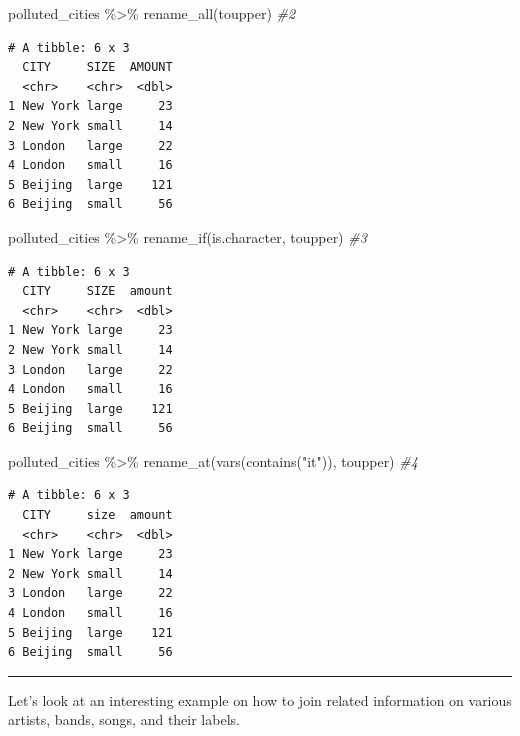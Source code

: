 \documentclass[
]{book}
\newenvironment{Shaded}{\begin{snugshade}}{\end{snugshade}}
\newcommand{\CommentTok}[1]{\textcolor[rgb]{0.56,0.35,0.01}{\textit{#1}}}
\newcommand{\FunctionTok}[1]{\textcolor[rgb]{0.00,0.00,0.00}{#1}}
\newcommand{\NormalTok}[1]{#1}
\newcommand{\SpecialCharTok}[1]{\textcolor[rgb]{0.00,0.00,0.00}{#1}}
\newcommand{\StringTok}[1]{\textcolor[rgb]{0.31,0.60,0.02}{#1}}
\begin{document}
\begin{Shaded}
\begin{Highlighting}[]
\NormalTok{polluted\_cities }\SpecialCharTok{\%\textgreater{}\%} \FunctionTok{rename\_all}\NormalTok{(toupper) }\CommentTok{\#2}
\end{Highlighting}
\end{Shaded}

\begin{verbatim}
# A tibble: 6 x 3
  CITY     SIZE  AMOUNT
  <chr>    <chr>  <dbl>
1 New York large     23
2 New York small     14
3 London   large     22
4 London   small     16
5 Beijing  large    121
6 Beijing  small     56
\end{verbatim}

\begin{Shaded}
\begin{Highlighting}[]
\NormalTok{polluted\_cities }\SpecialCharTok{\%\textgreater{}\%} \FunctionTok{rename\_if}\NormalTok{(is.character, toupper) }\CommentTok{\#3}
\end{Highlighting}
\end{Shaded}

\begin{verbatim}
# A tibble: 6 x 3
  CITY     SIZE  amount
  <chr>    <chr>  <dbl>
1 New York large     23
2 New York small     14
3 London   large     22
4 London   small     16
5 Beijing  large    121
6 Beijing  small     56
\end{verbatim}

\begin{Shaded}
\begin{Highlighting}[]
\NormalTok{polluted\_cities }\SpecialCharTok{\%\textgreater{}\%} \FunctionTok{rename\_at}\NormalTok{(}\FunctionTok{vars}\NormalTok{(}\FunctionTok{contains}\NormalTok{(}\StringTok{"it"}\NormalTok{)), toupper) }\CommentTok{\#4}
\end{Highlighting}
\end{Shaded}

\begin{verbatim}
# A tibble: 6 x 3
  CITY     size  amount
  <chr>    <chr>  <dbl>
1 New York large     23
2 New York small     14
3 London   large     22
4 London   small     16
5 Beijing  large    121
6 Beijing  small     56
\end{verbatim}

\begin{center}\rule{0.5\linewidth}{0.5pt}\end{center}

Let's look at an interesting example on how to join related information on various artists, bands, songs, and their labels.
\end{document}
